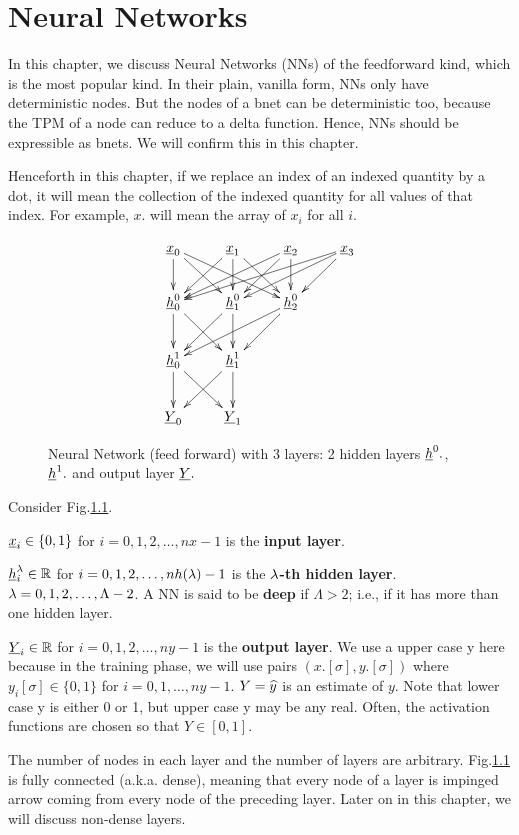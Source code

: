 \chapter{Neural Networks}\label{ch-nn}

In this chapter, we discuss
 Neural Networks (NNs) of the
feedforward kind,
which is the most popular kind. In their
 plain, vanilla form, NNs only
have deterministic nodes.
But the nodes of a bnet can
be deterministic too, because
the TPM
of a node
can reduce to a delta function.
Hence, NNs should be expressible
as bnets. We will confirm this
in this chapter.

Henceforth in this chapter,
if we replace an index of an
indexed quantity by a dot,
it will mean the collection
of the indexed quantity
for all values of that
index. For example, $x.$
will mean the
array of $x_i$ for all $i$.


\begin{figure}[h!]
\centering
$$\xymatrix{
\rvx_0
\ar[d]\ar[dr]\ar[drr]&
\rvx_1
 \ar[dl]\ar[d]\ar[dr]&
\rvx_2\ar[dll]\ar[dl]\ar[d]&
\rvx_3\ar[dlll]\ar[dll]\ar[dl]\\
\rvh_0^0\ar[d]\ar[dr]&
\rvh_1^0\ar[dl]\ar[d]&
\rvh_2^0\ar[dll]\ar[dl]\\
\rvh_0^1\ar[d]\ar[dr]&
\rvh_1^1\ar[dl]\ar[d]\\
\rvY_0&
\rvY_1
}$$
\caption{Neural Network (feed forward)
with 3 layers: 
2 hidden layers $\rvh^0.$,
$\rvh^1.$ and
output layer $\rvY.$ }
\label{fig-nn}
\end{figure}

Consider Fig.\ref{fig-nn}.

$\rvx_i\in
\{0,1\}$ for
$i=0, 1, 2, \dots,nx-1$
is the \textbf{input layer}.

$\rvh_i^\lam\in \RR$ for
$i=0, 1, 2, \dots,nh(\lambda)-1$
is the $\lambda$\textbf{-th hidden layer}.
$\lambda=0, 1, 2, \ldots, \Lambda-2$.
A NN is said to be {\bf deep} if
$\Lambda>2$; i.e., if it has
more than one hidden layer.

$\rvY_i\in \RR$ for
$i=0, 1, 2, \dots,ny-1$
is the \textbf{output layer}.
We use a upper case y
here because in the training phase,
we will use pairs $(x.[\sigma],y.[\sigma])$ where
$y_i[\sigma]\in \{0,1\}$
for $i=0, 1, \ldots, ny-1$.
$Y={\widehat{y}}$
is an estimate of $y$.
Note that lower case y is
either 0 or 1,
but upper case y may be
any real. Often, the
activation
functions are chosen so that
$Y\in[0,1]$.


The number of nodes in each layer
and the number of layers are arbitrary.
Fig.\ref{fig-nn} is fully connected
(a.k.a. dense), meaning that every node
of a layer is impinged
arrow coming
from every node of the preceding
layer. Later on in this chapter,
we will
discuss non-dense layers.


